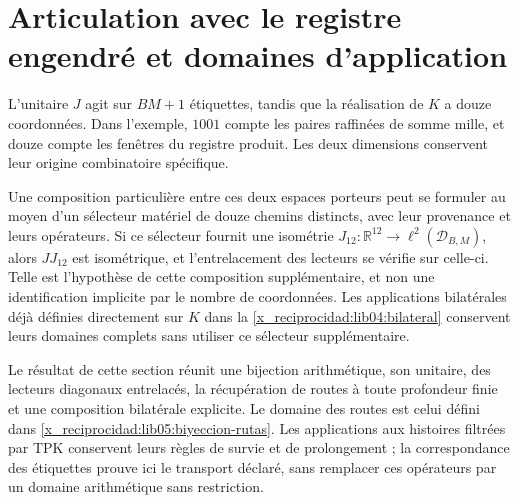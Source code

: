 \section{Articulation avec le registre engendré et domaines d'application}
\label{x_reciprocidad:lib05:dominios}

L’unitaire \(J\) agit sur \(BM+1\) étiquettes, tandis que
la réalisation de \(K\) a douze coordonnées. Dans l’exemple,
\(1001\) compte les paires raffinées de somme mille, et douze compte
les fenêtres du registre produit. Les deux dimensions conservent leur
origine combinatoire spécifique.

Une composition particulière entre ces deux espaces porteurs peut se formuler au moyen d'un sélecteur matériel de douze chemins distincts, avec leur provenance et leurs opérateurs. Si ce sélecteur fournit une isométrie \(J_{12}:\mathbb R^{12}\to\ell^2(\mathcal D_{B,M})\), alors \(JJ_{12}\) est isométrique, et l'entrelacement des lecteurs se vérifie sur celle-ci. Telle est l'hypothèse de cette composition supplémentaire, et non une identification implicite par le nombre de coordonnées. Les applications bilatérales déjà définies directement sur \(K\) dans la \cref{x_reciprocidad:lib04:bilateral} conservent leurs domaines complets sans utiliser ce sélecteur supplémentaire.

Le résultat de cette section réunit une bijection arithmétique, son
unitaire, des lecteurs diagonaux entrelacés, la récupération de routes à
toute profondeur finie et une composition bilatérale explicite.
Le domaine des routes est celui défini dans
\eqref{x_reciprocidad:lib05:biyeccion-rutas}. Les applications aux histoires
filtrées par TPK conservent leurs règles de survie et de
prolongement ; la correspondance des étiquettes prouve ici le
transport déclaré, sans remplacer ces opérateurs par un domaine
arithmétique sans restriction.
